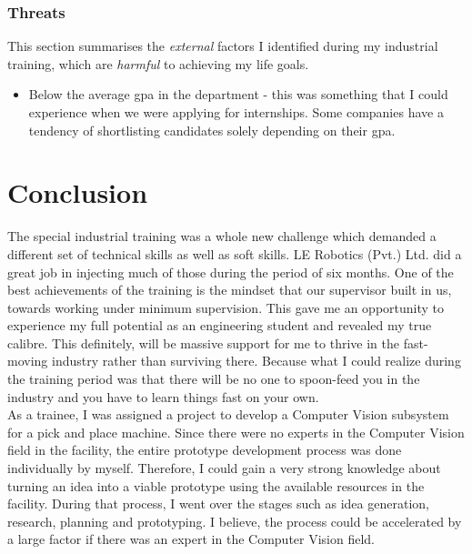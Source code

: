 \documentclass[a4paper,12pt]{report}
\begin{document}
\subsection{Threats}
This section summarises the \textit{external} factors I identified during my industrial training, which are \textit{harmful} to achieving my life goals.
\begin{itemize}
	\item Below the average \ac{gpa} in the department - this was something that I could experience when we were applying for internships. Some companies have a tendency of shortlisting candidates solely depending on their \ac{gpa}.
	
\end{itemize} 







\chapter{Conclusion}


The special industrial training was a whole new challenge which demanded a different set of technical skills as well as soft skills. LE Robotics (Pvt.) Ltd. did a great job in injecting much of those during the period of six months. One of the best achievements of the training is the mindset that our supervisor built in us, towards working under minimum supervision. This gave me an opportunity to experience my full potential as an engineering student and revealed my true calibre. This definitely, will be massive support for me to thrive in the fast-moving industry rather than surviving there. Because what I could realize during the training period was that there will be no one to spoon-feed you in the industry and you have to learn things fast on your own.\\

As a trainee, I was assigned a project to develop a Computer Vision subsystem for a pick and place machine. Since there were no experts in the Computer Vision field in the facility, the entire prototype development process was done individually by myself. Therefore, I could gain a very strong knowledge about turning an idea into a viable prototype using the available resources in the facility. During that process, I went over the stages such as idea generation, research, planning and prototyping. I believe, the process could be accelerated by a large factor if there was an expert in the Computer Vision field.\\
\end{document}
